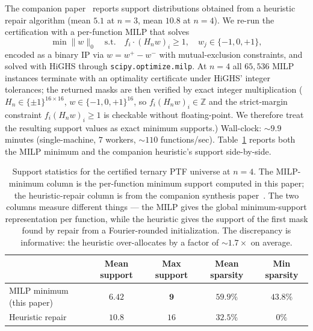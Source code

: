 \documentclass[11pt]{article}
\begin{document}
The companion paper~\cite{spectralSynthesisCompanion} reports support distributions obtained from a heuristic repair algorithm (mean $5.1$ at $n=3$, mean $10.8$ at $n=4$). We re-run the certification with a per-function MILP that solves
\[
\min \|w\|_0 \quad\text{s.t.}\quad f_i \cdot (H_n w)_i \ge 1,\quad w_j \in \{-1,0,+1\},
\]
encoded as a binary IP via $w = w^+ - w^-$ with mutual-exclusion constraints, and solved with HiGHS through \texttt{scipy.optimize.milp}. At $n=4$ all $65{,}536$ MILP instances terminate with an optimality certificate under HiGHS' integer tolerances; the returned masks are then verified by exact integer multiplication ($H_n \in \{\pm 1\}^{16 \times 16}$, $w \in \{-1, 0, +1\}^{16}$, so $f_i (H_n w)_i \in \mathbb{Z}$ and the strict-margin constraint $f_i (H_n w)_i \ge 1$ is checkable without floating-point. We therefore treat the resulting support values as exact minimum supports.) Wall-clock: $\sim 9.9$ minutes (single-machine, $7$ workers, $\sim 110$ functions/sec). Table~\ref{tab:support} reports both the MILP minimum and the companion heuristic's support side-by-side.

\begin{table}[t]
\centering
\small
\caption{Support statistics for the certified ternary PTF universe at $n=4$. The MILP-minimum column is the per-function minimum support computed in this paper; the heuristic-repair column is from the companion synthesis paper~\cite{spectralSynthesisCompanion}. The two columns measure different things --- the MILP gives the global minimum-support representation per function, while the heuristic gives the support of the first mask found by repair from a Fourier-rounded initialization. The discrepancy is informative: the heuristic over-allocates by a factor of $\sim 1.7\times$ on average.}
\label{tab:support}
\begin{tabular}{lcccc}
\toprule
& Mean support & Max support & Mean sparsity & Min sparsity \\
\midrule
MILP minimum (this paper) & $\mathbf{6.42}$ & $\mathbf{9}$ & $59.9\%$ & $43.8\%$ \\
Heuristic repair~\cite{spectralSynthesisCompanion} & $10.8$ & $16$ & $32.5\%$ & $0\%$ \\
\bottomrule
\end{tabular}
\end{table}
\end{document}
